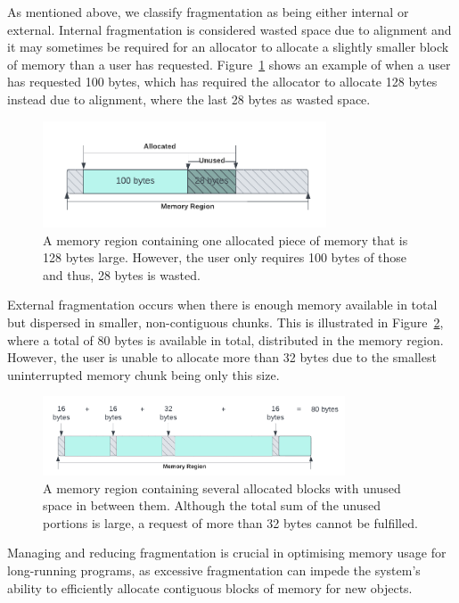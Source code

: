 
As mentioned above, we classify fragmentation as being either internal or external. Internal fragmentation is considered wasted space due to alignment and it may sometimes be required for an allocator to allocate a slightly smaller block of memory than a user has requested. Figure~\ref{fig:internal_fragmentation} shows an example of when a user has requested 100 bytes, which has required the allocator to allocate 128 bytes instead due to alignment, where the last 28 bytes as wasted space.


\begin{figure}[H]
    \centering
    \includegraphics[width=0.75\textwidth]{figures/internal_fragmentation.png}
    \caption{A memory region containing one allocated piece of memory that is 128 bytes large. However, the user only requires 100 bytes of those and thus, 28 bytes is wasted.}
    \label{fig:internal_fragmentation}
\end{figure}

External fragmentation occurs when there is enough memory available in total but dispersed in smaller, non-contiguous chunks. This is illustrated in Figure~\ref{fig:external_fragmentation}, where a total of 80 bytes is available in total, distributed in the memory region. However, the user is unable to allocate more than 32 bytes due to the smallest uninterrupted memory chunk being only this size.

\begin{figure}[H]
    \centering
    \includegraphics[width=0.8\textwidth]{figures/external_fragmentation.png}
    \caption{A memory region containing several allocated blocks with unused space in between them. Although the total sum of the unused portions is large, a request of more than 32 bytes cannot be fulfilled.}
    \label{fig:external_fragmentation}
\end{figure}

Managing and reducing fragmentation is crucial in optimising memory usage for long-running programs, as excessive fragmentation can impede the system's ability to efficiently allocate contiguous blocks of memory for new objects.




